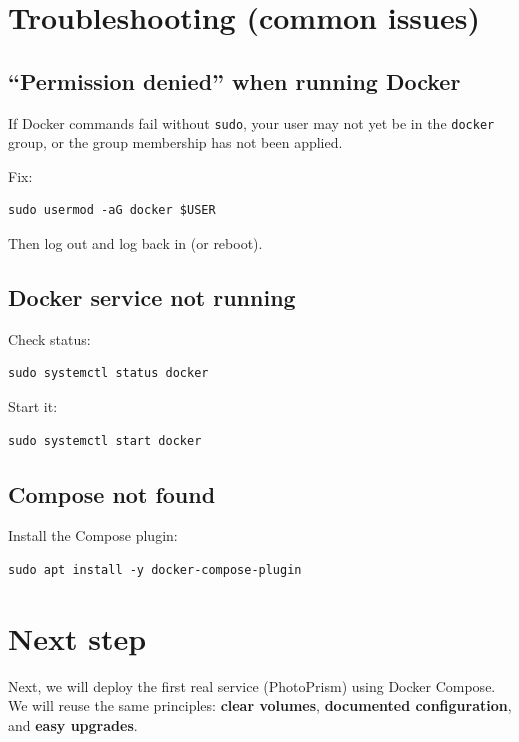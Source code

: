 \section{Troubleshooting (common issues)}
\subsection{``Permission denied'' when running Docker}
If Docker commands fail without \texttt{sudo}, your user may not yet be in the \texttt{docker} group,
or the group membership has not been applied.

Fix:
\begin{lstlisting}
sudo usermod -aG docker $USER
\end{lstlisting}
Then log out and log back in (or reboot).

\subsection{Docker service not running}
Check status:
\begin{lstlisting}
sudo systemctl status docker
\end{lstlisting}
Start it:
\begin{lstlisting}
sudo systemctl start docker
\end{lstlisting}

\subsection{Compose not found}
Install the Compose plugin:
\begin{lstlisting}
sudo apt install -y docker-compose-plugin
\end{lstlisting}

\section{Next step}
Next, we will deploy the first real service (PhotoPrism) using Docker Compose.
We will reuse the same principles:
\textbf{clear volumes}, \textbf{documented configuration}, and \textbf{easy upgrades}. 